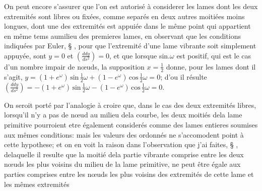 \documentclass[11pt,a4paper]{article}
\begin{document}
On peut encore s'assurer que l'on est autorisé à considerer les lames dont
les deux extremités sont libres ou fixées, comme separés en deux autres moitiées
moins longues, dont une des extremités est appuiée dans le même point qui
appartient en même tems aumilieu des premieres lames, en observant que les
conditions indiquées par Euler, § , pour que l'extremité d'une lame
vibrante soit simplement appuyée, sont $y = 0$ et $\left(\frac{ddy}{ds^2}\right) = 0$,
et que lorsque sin.$\omega$ est positif, qui est le cas d'un nombre impair de
nœuds, la supposition $x = \frac{1}{2}$ donne, pour les lames dont il s'agit,
$y = (1 + e^{\omega})\,\text{sin}\,\frac{1}{2}\omega + (1 - e^{\omega})\,\text{cos}\,\frac{1}{2}\omega = 0$; d'ou il résulte $\left(\frac{ddy}{ds^2}\right) = -(1 + e^{\omega})\,\text{sin}\,\frac{1}{2}\omega - (1 - e^{\omega})\,\text{cos}\,\frac{1}{2}\omega = 0$.


On seroit porté par l'analogie à croire que, dans le cas des deux extremités libres,
lorsqu'il n'y a pas de nœud au milieu dela courbe, les deux moitiés dela lame
primitive pourroient etre également considerés comme des lames entieres soumises
aux mêmes conditions: mais les valeurs des ordonnés ne s'accomodent point à cette
hypothese; et on en voit la raison dans l'observation que j'ai faites, § , delaquelle
il resulte que la moitié dela partie vibrante comprise entre les deux nœuds les
plus voisins du milieu de la lame primitive, ne peut être égale aux parties
comprises entre les nœuds les plus voisins des extremités de cette lame et les mêmes
extremités
\end{document}
